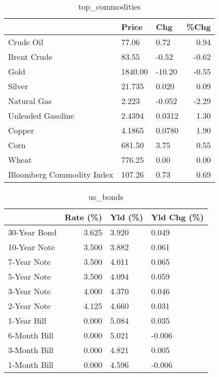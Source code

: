 \documentclass{article}%
\begin{document}
\begin{table}[htbp]%
\caption{top\_commodities}%
\centering%
\begin{adjustbox}{width=1\textwidth}%
\begin{tabular}{lllr}
\toprule
                          &   Price &    Chg &  \%Chg \\
\midrule
               Crude Oil  &   77.06 &   0.72 &  0.94 \\
             Brent Crude  &   83.55 &  -0.52 & -0.62 \\
                    Gold  & 1840.00 & -10.20 & -0.55 \\
                  Silver  &  21.735 &  0.020 &  0.09 \\
             Natural Gas  &   2.223 & -0.052 & -2.29 \\
       Unleaded Gasoline  &  2.4394 & 0.0312 &  1.30 \\
                  Copper  &  4.1865 & 0.0780 &  1.90 \\
                    Corn  &  681.50 &   3.75 &  0.55 \\
                   Wheat  &  776.25 &   0.00 &  0.00 \\
Bloomberg Commodity Index &  107.26 &   0.73 &  0.69 \\
\bottomrule
\end{tabular}
%
\end{adjustbox}%
\end{table}

%


\begin{table}[htbp]%
\caption{us\_bonds}%
\centering%
\begin{adjustbox}{width=1\textwidth}%
\begin{tabular}{lrll}
\toprule
             &  Rate (\%) & Yld (\%) & Yld Chg (\%) \\
\midrule
30-Year Bond &     3.625 &   3.920 &       0.049 \\
10-Year Note &     3.500 &   3.882 &       0.061 \\
 7-Year Note &     3.500 &   4.011 &       0.065 \\
 5-Year Note &     3.500 &   4.094 &       0.059 \\
 3-Year Note &     4.000 &   4.370 &       0.046 \\
 2-Year Note &     4.125 &   4.660 &       0.031 \\
 1-Year Bill &     0.000 &   5.084 &       0.035 \\
6-Month Bill &     0.000 &   5.021 &      -0.006 \\
3-Month Bill &     0.000 &   4.821 &       0.005 \\
1-Month Bill &     0.000 &   4.596 &      -0.006 \\
\bottomrule
\end{tabular}
%
\end{adjustbox}%
\end{table}
\end{document}
